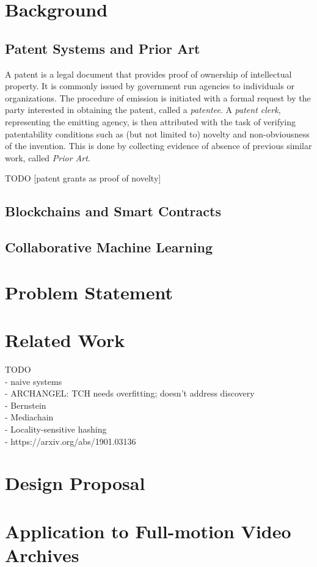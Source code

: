 \documentclass[conference]{IEEEtran}
\begin{document}
\section{Background}
\subsection{Patent Systems and Prior Art}
A patent is a legal document that provides proof of ownership of intellectual property. It is commonly issued by government run agencies to individuals or organizations. The procedure of emission is initiated with a formal request by the party interested in obtaining the patent, called a \emph{patentee}. A \emph{patent clerk}, representing the emitting agency, is then attributed with the task of verifying patentability conditions such as (but not limited to) novelty and non-obviousness of the invention. This is done by collecting evidence of absence of previous similar work, called \emph{Prior Art}.

TODO [patent grants as proof of novelty]

\subsection{Blockchains and Smart Contracts}
\subsection{Collaborative Machine Learning}
\section{Problem Statement}
\section{Related Work}
TODO \\
- naive systems\\
- ARCHANGEL: TCH needs overfitting; doesn't address discovery\\
- Bernstein\\
- Mediachain\\
- Locality-sensitive hashing\\
- https://arxiv.org/abs/1901.03136\\
\section{Design Proposal}
\section{Application to Full-motion Video Archives}
\end{document}
